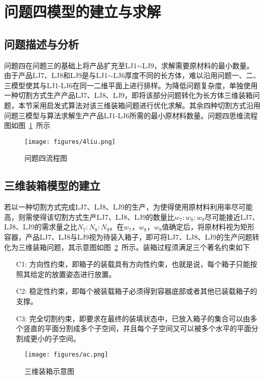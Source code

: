 \documentclass{whutmod}
\newcommand{\upcite}[1]{\textsuperscript{\cite{#1}}}
\begin{document}
  	\section{问题四模型的建立与求解}
  	\subsection{问题描述与分析}
  		问题四在问题三的基础上将产品扩充至LJ1$\sim$LJ9，求解需要原材料的最小数量。由于产品LJ7、LJ8和LJ9是与LJ1$\sim$LJ6厚度不同的长方体，难以沿用问题一、二、三模型使其与LJ1-LJ6在同一二维平面上进行排样。为降低问题复杂度，单独使用一种切割方式生产产品LJ7、LJ8、LJ9，即将该部分问题转化为长方体三维装箱问题，本节采用启发式算法对该三维装箱问题进行优化求解。其余四种切割方式沿用问题三模型与算法求解生产产品LJ1-LJ6所需的最小原材料数量。问题四思维流程图如图~\ref{dfasfd}~所示
  	\begin{figure}[H]
  		\centering
  		\texttt{[image: figures/4liu.png]}
  		\caption{问题四流程图}\label{dfasfd}
  	\end{figure}
  	
  	\subsection{三维装箱模型的建立}
  	若以一种切割方式完成LJ7、LJ8、LJ9的生产，为使得使用原材料利用率尽可能高，则需使得该切割方式生产LJ7、LJ8、LJ9的数量比$w_7:w_8:w_9$尽可能接近LJ7、LJ8、LJ9的需求量之比$N_7:N_8:N_9$。在$w_7$，$w_8$，$w_9$值确定后，将原材料视为矩形容器，产品LJ7、LJ8与LJ9视为待装入箱子，即可将LJ7、LJ8、LJ9的生产问题转化为三维装箱问题，其示意图如图~\ref{sdaasd}~所示。装箱过程须满足三个著名约束\upcite{8}如下
  	\begin{itemize}
  			\item[C1:]方向性约束，即箱子的装载具有方向性约束，也就是说，每个箱子只能按照其给定的放置姿态进行放置。
  			\item[C2:]稳定性约束，即每个被装载箱子必须得到容器底部或者其他已装载箱子的支撑。
  		\item[C3:]完全切割约束，即要求在最终的装填状态中，已放入箱子的集合可以由多个竖直的平面分割成多个子空间，并且每个子空间又可以被多个水平的平面分割成更小的子空间。
  	\end{itemize}
    \begin{figure}[H]
  	\centering
  	\texttt{[image: figures/ac.png]}
  	\caption{三维装箱示意图}\label{sdaasd}
  \end{figure}
\end{document}
